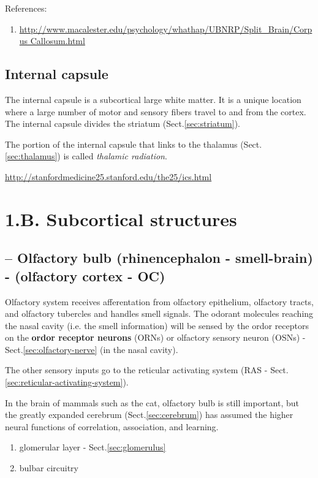 References:
\begin{enumerate}
\item \url{http://www.macalester.edu/psychology/whathap/UBNRP/Split_Brain/Corpus Callosum.html}
\end{enumerate}

\subsection{Internal capsule}
\label{sec:internal_capsule}

The internal capsule is a subcortical large white matter.
It is a unique location where a large number of motor and sensory fibers travel
to and from the cortex.  The internal capsule divides the striatum
(Sect.\ref{sec:striatum}).

The portion of the internal capsule that links to the thalamus
(Sect.\ref{sec:thalamus}) is called {\it thalamic radiation}.

\url{http://stanfordmedicine25.stanford.edu/the25/ics.html}


\section{1.B. Subcortical structures}
\subsection{-- Olfactory bulb (rhinencephalon -
smell-brain) - (olfactory cortex - OC)}
\label{sec:olfactory-bulb}
\label{sec:olfactory-cortex}
\label{sec:rhinencephalon}

Olfactory system receives afferentation from olfactory epithelium, olfactory
tracts, and olfactory tubercles and handles smell signals. The odorant molecules
reaching the nasal cavity (i.e. the smell information) will be sensed by the
ordor receptors on the {\bf ordor receptor neurons} (ORNs) or olfactory sensory
neuron (OSNs) - Sect.\ref{sec:olfactory-nerve} (in the nasal cavity).

\begin{mdframed}
The other sensory inputs go to the reticular activating system (RAS -
Sect.\ref{sec:reticular-activating-system}).
\end{mdframed}

In the brain of mammals such as the cat, olfactory bulb is still important, but
the greatly expanded cerebrum (Sect.\ref{sec:cerebrum}) has assumed the higher
neural functions of correlation, association, and learning.
\begin{enumerate}
  \item glomerular layer - Sect.\ref{sec:glomerulus}
  
  \item bulbar circuitry
\end{enumerate}

